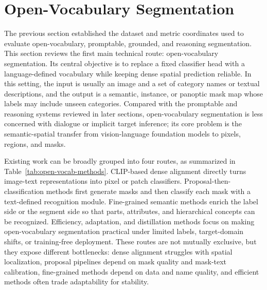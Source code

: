 \section{Open-Vocabulary Segmentation}
\label{sec:open-vocabulary-segmentation}

The previous section established the dataset and metric coordinates used to evaluate open-vocabulary, promptable, grounded, and reasoning segmentation. This section reviews the first main technical route: open-vocabulary segmentation. Its central objective is to replace a fixed classifier head with a language-defined vocabulary while keeping dense spatial prediction reliable. In this setting, the input is usually an image and a set of category names or textual descriptions, and the output is a semantic, instance, or panoptic mask map whose labels may include unseen categories. Compared with the promptable and reasoning systems reviewed in later sections, open-vocabulary segmentation is less concerned with dialogue or implicit target inference; its core problem is the semantic-spatial transfer from vision-language foundation models to pixels, regions, and masks.

Existing work can be broadly grouped into four routes, as summarized in Table~\ref{tab:open-vocab-methods}. CLIP-based dense alignment directly turns image-text representations into pixel or patch classifiers. Proposal-then-classification methods first generate masks and then classify each mask with a text-defined recognition module. Fine-grained semantic methods enrich the label side or the segment side so that parts, attributes, and hierarchical concepts can be recognized. Efficiency, adaptation, and distillation methods focus on making open-vocabulary segmentation practical under limited labels, target-domain shifts, or training-free deployment. These routes are not mutually exclusive, but they expose different bottlenecks: dense alignment struggles with spatial localization, proposal pipelines depend on mask quality and mask-text calibration, fine-grained methods depend on data and name quality, and efficient methods often trade adaptability for stability.

